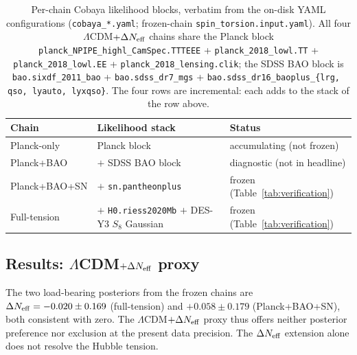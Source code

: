 \documentclass[aps,prd,twocolumn,superscriptaddress,showpacs,preprintnumbers,nofootinbib,longbibliography,floatfix]{revtex4-2}
\newcommand{\Neff}{N_{\rm eff}}
\begin{document}
\begin{table}[tb]
\caption{\label{tab:chain_datasets} Per-chain Cobaya likelihood blocks,
verbatim from the on-disk YAML configurations
(\texttt{cobaya\_*.yaml}; frozen-chain \texttt{spin\_torsion.input.yaml}).
All four
$\Lambda$CDM$+\Delta\Neff$ chains share the Planck block
\texttt{planck\_NPIPE\_highl\_CamSpec.TTTEEE} +
\texttt{planck\_2018\_lowl.TT} + \texttt{planck\_2018\_lowl.EE} +
\texttt{planck\_2018\_lensing.clik}; the SDSS BAO block is
\texttt{bao.sixdf\_2011\_bao} + \texttt{bao.sdss\_dr7\_mgs} +
\texttt{bao.sdss\_dr16\_baoplus\_\{lrg,\,qso,\,lyauto,\,lyxqso\}}.
The four rows are incremental: each adds to the stack of the row
above.}
\begin{ruledtabular}
\footnotesize
\begin{tabular}{lll}
Chain & Likelihood stack & Status \\
\hline
Planck-only & Planck block & accumulating (not frozen) \\
Planck+BAO & $+$ SDSS BAO block & diagnostic (not in headline) \\
Planck+BAO+SN & $+$ \texttt{sn.pantheonplus} & frozen (Table~\ref{tab:verification}) \\
Full-tension & $+$ \texttt{H0.riess2020Mb} $+$ DES-Y3 $S_8$ Gaussian & frozen (Table~\ref{tab:verification}) \\
\end{tabular}
\end{ruledtabular}
\end{table}

\subsection{Results: $\Lambda$CDM$+\Delta N_{\rm eff}$ proxy}

The two load-bearing posteriors from the frozen chains are
$\Delta N_{\rm eff} = -0.020 \pm 0.169$ (full-tension) and
$+0.058 \pm 0.179$ (Planck+BAO+SN), both consistent with zero.
The $\Lambda$CDM$+\Delta\Neff$ proxy thus offers neither posterior
preference nor exclusion at the present data precision. The
$\Delta\Neff$ extension alone does not resolve the Hubble tension.
\end{document}
